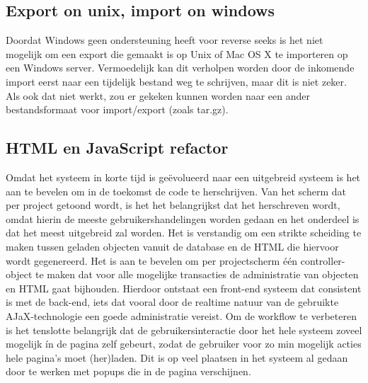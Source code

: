 \subsection{Export on unix, import on windows}
Doordat Windows geen ondersteuning heeft voor reverse seeks is het niet mogelijk om een export die gemaakt is op Unix of Mac OS X te importeren op een Windows server. Vermoedelijk kan dit verholpen worden door de inkomende import eerst naar een tijdelijk bestand weg te schrijven, maar dit is niet zeker. Als ook dat niet werkt, zou er gekeken kunnen worden naar een ander bestandsformaat voor import/export (zoals tar.gz).

\subsection{HTML en JavaScript refactor}
Omdat het systeem in korte tijd is ge\"evolueerd naar een uitgebreid systeem is het aan te bevelen om in de toekomst de code te herschrijven.
Van het scherm dat per project getoond wordt, is het het belangrijkst dat het herschreven wordt, omdat hierin de meeste gebruikershandelingen worden gedaan en het onderdeel is dat het meest uitgebreid zal worden.
Het is verstandig om een strikte scheiding te maken tussen geladen objecten vanuit de database en de HTML die hiervoor wordt gegenereerd.
Het is aan te bevelen om per projectscherm \'{e}\'{e}n controller-object te maken dat voor alle mogelijke transacties de administratie van objecten en HTML gaat bijhouden.
Hierdoor ontstaat een front-end systeem dat consistent is met de back-end, iets dat vooral door de realtime natuur van de gebruikte AJaX-technologie een goede administratie vereist.
Om de workflow te verbeteren is het tenslotte belangrijk dat de gebruikersinteractie door het hele systeem zoveel mogelijk \'in de pagina zelf gebeurt, zodat de gebruiker voor zo min mogelijk acties hele pagina's moet (her)laden.
Dit is op veel plaatsen in het systeem al gedaan door te werken met popups die in de pagina verschijnen.
